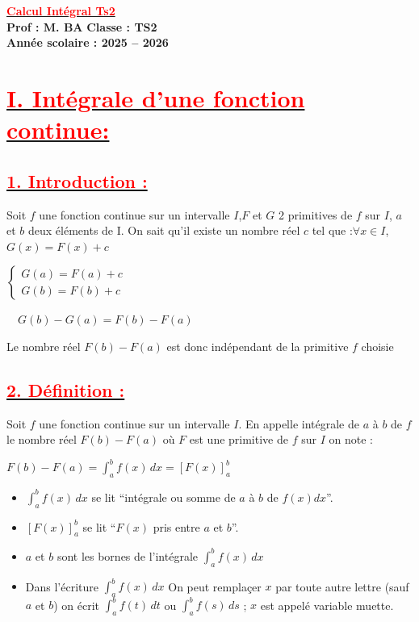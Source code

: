 \documentclass[12pt,a4paper]{article}
\begin{document}
\begin{center}
    \Large\textbf{\underline{\textcolor{red}{Calcul Intégral Ts2}}}\\[-0.1cm]
    \normalsize\textbf{Prof : M. BA} \hfill \textbf{Classe : TS2}\\[-0.1cm]
    \textbf{Année scolaire : 2025 -- 2026}
\end{center}

\section*{\underline{\textbf{\textcolor{red}{I. Intégrale d'une fonction continue: }}}}
\subsection*{\underline{\textbf{\textcolor{red}{1. Introduction :}}}}

Soit \( f \) une fonction continue sur un intervalle \( I \),\( F \) et \( G \) 2 primitives de \( f \) sur \( I \), \( a \) et \( b  \) deux éléments de I. On sait qu'il existe un nombre réel $c$ tel que :$\forall x\in I$, 
 \( G(x) = F(x) + c \)

\underline{\( 
\begin{cases}
G(a) = F(a) + c\\
G(b) = F(b) + c
\end{cases}
\)}

\(
\quad G(b) - G(a) = F(b) - F(a)
\)

Le nombre réel \( F(b) - F(a) \) est donc indépendant de la primitive \( f \) choisie

\subsection*{\underline{\textbf{\textcolor{red}{2. Définition :}}}}

Soit \( f \) une fonction continue sur un intervalle \( I \).
En appelle intégrale de \( a \) à \( b \) de \( f \) le nombre réel \( F(b) - F(a) \) où \( F \) est une primitive de \( f \) sur \( I \) on note :

\(
F(b) - F(a) = \int_{a}^{b} f(x) \, dx = \left[ F(x) \right]_{a}^{b}
\)

\begin{itemize}
    \item \( \int_a^b f(x) \, dx \) se lit ``intégrale ou somme  de $a$ à $b$ de $f(x)dx$''.
    \item \( \left[ F(x) \right]_a^b \) se lit ``\( F(x) \) pris entre \( a \) et \( b \)''.
    \item \( a \) et \( b \) sont les bornes de l'intégrale \( \int_a^b f(x) \, dx \)
        \item Dans l'écriture \( \int_a^b f(x) \, dx \) On peut remplaçer \( x \) par toute autre lettre (sauf \( a \) et \( b \)) on écrit \( \int_a^b f(t) \, dt \) ou \( \int_a^b f(s) \, ds \) ; \( x \) est appelé variable muette.
\end{itemize}
\end{document}
